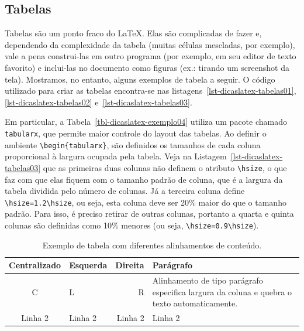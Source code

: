 \subsection{Tabelas}
\label{sec-dicaslatex-tabelas}

Tabelas são um ponto fraco do \LaTeX. Elas são complicadas de fazer e, dependendo da complexidade da tabela (muitas células mescladas, por exemplo), vale a pena construi-las em outro programa (por exemplo, em seu editor de texto favorito) e inclui-las no documento como figuras (ex.: tirando um screenshot da tela). Mostramos, no entanto, alguns exemplos de tabela a seguir. O código utilizado para criar as tabelas encontra-se nas listagens~\ref{lst-dicaslatex-tabelas01}, \ref{lst-dicaslatex-tabelas02} e~\ref{lst-dicaslatex-tabelas03}.







Em particular, a Tabela~\ref{tbl-dicaslatex-exemplo04} utiliza um pacote chamado \texttt{tabularx}, que permite maior controle do layout das tabelas. Ao definir o ambiente \texttt{\textbackslash begin\{tabularx\}}, são definidos os tamanhos de cada coluna proporcional à largura ocupada pela tabela. Veja na Listagem~\ref{lst-dicaslatex-tabelas03} que as primeiras duas colunas não definem o atributo \texttt{\textbackslash hsize}, o que faz com que elas fiquem com o tamanho padrão de coluna, que é a largura da tabela dividida pelo número de colunas. Já a terceira coluna define \texttt{\textbackslash hsize=1.2\textbackslash hsize}, ou seja, esta coluna deve ser 20\% maior do que o tamanho padrão. Para isso, é preciso retirar de outras colunas, portanto a quarta e quinta colunas são definidas como 10\% menores (ou seja, \texttt{\textbackslash hsize=0.9\textbackslash hsize}).

\begin{table}
\caption{Exemplo de tabela com diferentes alinhamentos de conteúdo.}
\label{tbl-dicaslatex-exemplo01}
\centering
\begin{tabular}{ | c | l | r | p{40mm} |}\hline
\textbf{Centralizado} & \textbf{Esquerda} & \textbf{Direita} & \textbf{Parágrafo}\\\hline
C & L & R & Alinhamento de tipo parágrafo especifica largura da coluna e quebra o texto automaticamente.\\
\hline
Linha 2 & Linha 2 & Linha 2 & Linha 2\\
\hline
\end{tabular}
\end{table}

